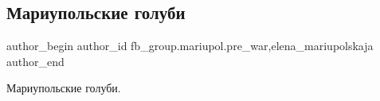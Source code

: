  
 
 
 
 

\subsection{Мариупольские голуби}
\label{sec:12_02_2023.fb.fb_group.mariupol.pre_war.3.mariupolskie_golubi}
 
\ifcmt
 author_begin
   author_id fb_group.mariupol.pre_war,elena_mariupolskaja
 author_end
\fi

Мариупольские голуби.
